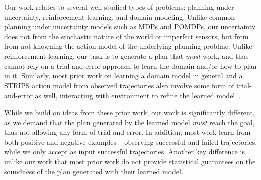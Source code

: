 \documentclass[letterpaper]{article}
\begin{document}
Our work relates to several well-studied types of problems: planning under uncertainty, reinforcement learning, and domain modeling. 
Unlike common planning under uncertainty models such as MDPs and POMDPs, our uncertainty does not 
from the stochastic nature of the world or imperfect sensors, but from from not knowning the action model of the underlying planning problme. Unlike reinforcement learning, our task is to generate a plan that {\em must} work, and thus cannot rely on a trial-and-error approach to learn the domain and/or how to plan in it. 
Similarly, most prior work on learning a domain model in general and a STRIPS action model from observed trajectories also involve some form of trial-and-error as well, interacting with environment to refine the learned model~\cite{mourao2012learning,wang1994learning,wang1994learning,walsh2008efficientLearning,levine2006explanation,jimenez2013integrating}. 


While we build on ideas from these prior work, our work is significantly different, as we demand that  the plan generated by the learned model {\em must} reach the goal, thus not allowing any form of trial-and-error. 
In addition, most work learn from both positive and negative examples -- observing successful and failed trajectories, while we only accept as input successful trajectories. 
Another key difference is unlike our work that most prior work do not provide statistical guarantees on the soundness of the plan generated with their learned model. 


\end{document}
